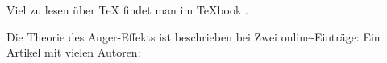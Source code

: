 \documentclass{scrartcl}
\begin{document}
\noindent Viel zu lesen über \TeX{} findet 
man im \TeX{}book \autocite{Knuth1984}.

\noindent 
Die Theorie des Auger-Effekts ist beschrieben bei \textcite{AAberg1982}
Zwei \glqq{}online\grqq{}-Einträge: \autocite{Kramida2015, Bezanson2015}
Ein Artikel mit vielen Autoren: \autocite{Uiberacker2007}

\printbibliography
\end{document}
